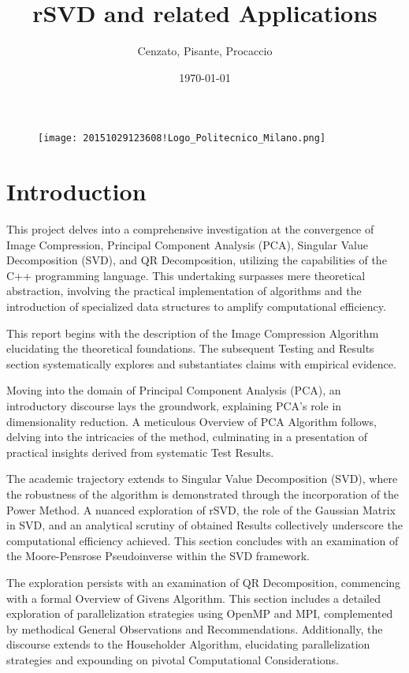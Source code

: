 \documentclass{article}
\begin{document}
\title{rSVD and related Applications}
\author{Cenzato, Pisante, Procaccio}
\date{\today}
\maketitle
\begin{figure}[h]
    \centering
    \texttt{[image: 20151029123608!Logo\_Politecnico\_Milano.png]}
\end{figure}
\newpage


\tableofcontents
\newpage

\section*{Introduction}

This project delves into a comprehensive investigation at the convergence of Image Compression, Principal Component Analysis (PCA), Singular Value Decomposition (SVD), and QR Decomposition, utilizing the capabilities of the C++ programming language. This undertaking surpasses mere theoretical abstraction, involving the practical implementation of algorithms and the introduction of specialized data structures to amplify computational efficiency.

This report begins with the description of the Image Compression Algorithm elucidating the theoretical foundations. The subsequent Testing and Results section systematically explores and substantiates claims with empirical evidence.

Moving into the domain of Principal Component Analysis (PCA), an introductory discourse lays the groundwork, explaining PCA's role in dimensionality reduction. A meticulous Overview of PCA Algorithm follows, delving into the intricacies of the method, culminating in a presentation of practical insights derived from systematic Test Results.

The academic trajectory extends to Singular Value Decomposition (SVD), where the robustness of the algorithm is demonstrated through the incorporation of the Power Method. A nuanced exploration of rSVD, the role of the Gaussian Matrix in SVD, and an analytical scrutiny of obtained Results collectively underscore the computational efficiency achieved. This section concludes with an examination of the Moore-Pensrose Pseudoinverse within the SVD framework.

The exploration persists with an examination of QR Decomposition, commencing with a formal Overview of Givens Algorithm. This section includes a detailed exploration of parallelization strategies using OpenMP and MPI, complemented by methodical General Observations and Recommendations. Additionally, the discourse extends to the Householder Algorithm, elucidating parallelization strategies and expounding on pivotal Computational Considerations.
\end{document}
